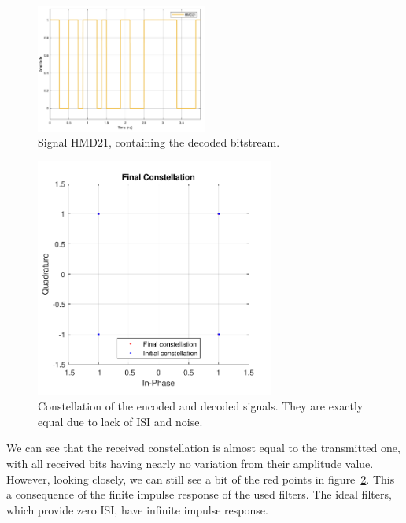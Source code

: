 	\begin{figure}[H]
		\centering
		\includegraphics[width=0.5\textwidth]		
		{./sdf/m_qam_system/figures/simulations/01_noISI/HMD21.pdf}
	\caption{Signal HMD21, containing the decoded 
	bitstream.}\label{fig:ISIhmd21}
\end{figure}

	\begin{figure}[H]
		\centering
		\includegraphics[width=0.7\textwidth]
		{sdf/m_qam_system/figures/simulations/01_noISI/constFinal.pdf}
	\caption{  Constellation of the encoded and decoded 
		signals. They are exactly equal due to lack of ISI and 
		noise.}\label{fig:ISIconsts}
\end{figure}

We can see that the received constellation is almost equal to the transmitted 
one, with all received 
bits having nearly no variation from their amplitude value. However, looking 
closely, we can still see a bit of the red points in 
figure~\ref{fig:ISIconsts}. This a consequence of the finite impulse response 
of the 
used filters. The ideal filters, which provide zero ISI, have infinite impulse 
response. 

